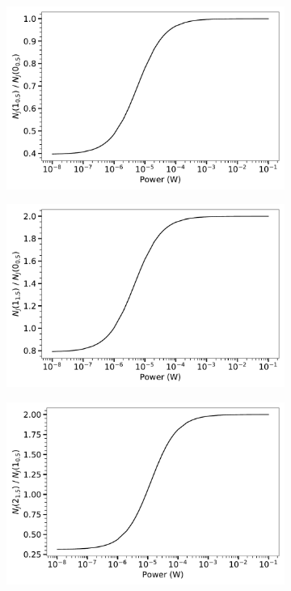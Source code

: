 \begin{figure}[!htb]
    \centering
    \begin{subfigure}[b]{0.49\textwidth}
        \centering
        \includegraphics[width=1\textwidth]{chapters/CO+_ROSAA_paper/SI/functionOfpower_CO^+_0_0.5 - 1_0.5_4.e+14.pdf}
    \end{subfigure}
    \hfill
    \begin{subfigure}[b]{0.49\textwidth}
        \centering
        \includegraphics[width=1\textwidth]{chapters/CO+_ROSAA_paper/SI/functionOfpower_CO^+_0_0.5 - 1_1.5_4.e+14.pdf}
    \end{subfigure}
    \hfill
    \begin{subfigure}[b]{0.49\textwidth}
        \centering
        \includegraphics[width=1\textwidth]{chapters/CO+_ROSAA_paper/SI/functionOfpower_CO^+_1_0.5 - 2_1.5_4.e+14.pdf}

\end{subfigure}
\end{figure}

